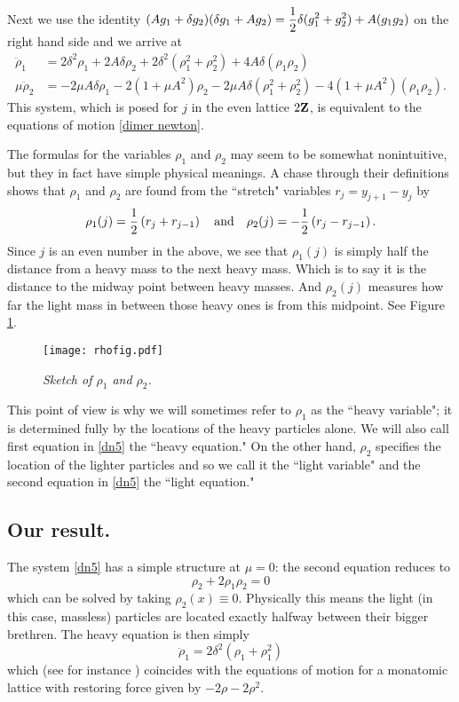 \documentclass[12pt]{amsart}
\numberwithin{equation}{section}
\newcommand{\ds}{\displaystyle}
\newcommand{\be}{\begin{equation}}
\newcommand{\ee}{\end{equation}}
\newcommand{\bes}{\begin{equation*}}
\newcommand{\ees}{\end{equation*}}
\newcommand{\mand}{\quad \text{and}\quad}
\newcommand{\Z}{{\bf{Z}}}
\begin{document}
Next we use the identity $\ds
(Ag_1 + \delta g_2)(\delta g_1 + A g_2) = {1 \over 2} \delta  (g_1^2 +g_2^2) + A (g_1 g_2)
$
on the right hand side and we arrive at
\be\begin{split}\label{dn5}
  \ddot \rho_1 & = 2 \delta^2 \rho_1 + 2A\delta \rho_2  + 2\delta^2 (\rho_1^2 +\rho_2^2) + 4A\delta (\rho_1 \rho_2)\\
\mu \ddot \rho_2 & = -2 \mu A \delta \rho_1 -2(1+\mu A^2) \rho_2 -2\mu A  \delta  (\rho_1^2 +\rho_2^2) - 4(1+ \mu A^2)( \rho_1 \rho_2) .
\end{split}\ee
This system, which is posed for $j$ in the even lattice $2\Z$, is equivalent to 
the equations of motion \eqref{dimer newton}.  


The formulas for the variables $\rho_1$ and $\rho_2$ may
seem to be somewhat nonintuitive, but they in fact have simple physical meanings. 
A chase through their definitions shows that $\rho_1$ and $\rho_2$ are found
from the ``stretch" variables $r_j = y_{j+1} - y_j$ by
\bes
\rho_1(j) = {1 \over 2} \left( r_j+r_{j-1}\right)
\mand
\rho_2(j) = -{1 \over 2} \left(r_{j}-r_{j-1}\right).
\ees
Since $j$ is an even number in the above, we see that $\rho_1(j)$ is simply half the distance from a heavy mass
to the next heavy mass. Which is to say it is the distance to the midway point between heavy masses.
And $\rho_2(j)$ measures how far the light mass in between those heavy ones is from this midpoint.
See Figure \ref{rhofig}.
\begin{figure}
\centering
    \texttt{[image: rhofig.pdf]}
 \caption{  \it Sketch of $\rho_1$ and $\rho_2$.
 \label{rhofig}}
\end{figure}
This point of view is why we will sometimes refer to $\rho_1$ as the ``heavy variable"; it is determined
fully by the locations of  the heavy particles alone. We will also call first equation in \eqref{dn5}  the ``heavy equation."
On the other hand, $\rho_2$ specifies the location of the lighter particles
and so we call it the ``light variable" and the second equation in \eqref{dn5}
the ``light equation."

\subsection{Our result.}
The system \eqref{dn5}
has a simple structure at $\mu = 0$: 
the second equation reduces to 
\be\label{rho2 at zero}
\rho_2 + 2\rho_1 \rho_2 =0
\ee which can be solved by taking $\rho_2(x) \equiv 0$. 
Physically this means the light (in this case, massless) particles are located exactly halfway between their bigger brethren. %
The heavy equation is then simply \be\label{rho1 at zero}
\ddot \rho_1 = 2 \delta^2 \left(\rho_1 +  \rho_1^2\right)\ee which  (see for instance \cite{friesecke-pego1}) coincides with the equations
of motion for a  monatomic lattice with restoring force given by $-2\rho - 2\rho^2$.
\end{document}
